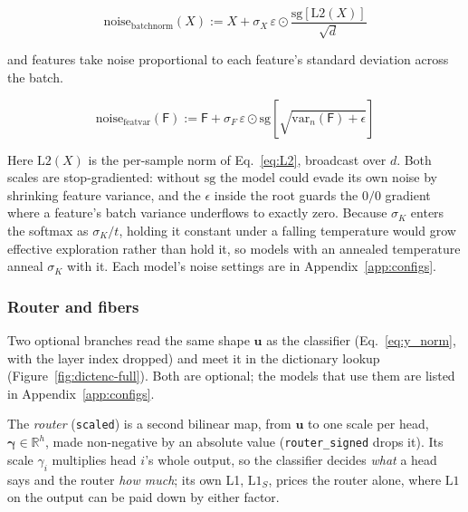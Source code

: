 \begin{equation}
	\mathrm{noise}_{\mathrm{batchnorm}}(X) := X + \sigma_X\,\varepsilon
	\odot \frac{\mathrm{sg}\!\left[\mathrm{L2}(X)\right]}{\sqrt{d}}
	\label{eq:noise_batchnorm}
\end{equation}

and features take noise proportional to each feature's standard
deviation across the batch.

\begin{equation}
	\mathrm{noise}_{\mathrm{featvar}}(\mathsf{F}) := \mathsf{F} +
	\sigma_F\,\varepsilon \odot \mathrm{sg}\!\left[
	\sqrt{\mathrm{var}_n(\mathsf{F}) + \epsilon}\right]
	\label{eq:noise_featvar}
\end{equation}

Here $\mathrm{L2}(X)$ is the per-sample norm of
Eq.~\eqref{eq:L2}, broadcast over $d$. Both scales are
stop-gradiented: without $\mathrm{sg}$ the model could evade its own
noise by shrinking feature variance, and the $\epsilon$ inside the root
guards the $0/0$ gradient where a feature's batch variance underflows to
exactly zero. Because $\sigma_K$ enters the softmax as $\sigma_K/t$,
holding it constant under a falling temperature would grow effective
exploration rather than hold it, so models with an annealed temperature
anneal $\sigma_K$ with it. Each model's noise settings are in
Appendix~\ref{app:configs}.

\subsubsection{Router and fibers}
\label{sec:router-fiber}
Two optional branches read the same shape $\mathbf{u}$ as the classifier
(Eq.~\eqref{eq:y_norm}, with the layer index dropped) and meet it in
the dictionary lookup
(Figure~\ref{fig:dictenc-full}). Both are optional; the models that use
them are listed in Appendix~\ref{app:configs}.

The \emph{router} (\texttt{scaled}) is a second bilinear map, from
$\mathbf{u}$ to one scale per head, $\boldsymbol{\gamma} \in \mathbb{R}^h$,
made non-negative by an absolute value
(\texttt{router\_signed} drops it). Its scale $\gamma_i$ multiplies head
$i$'s whole output, so
the classifier decides \emph{what} a head says and the router \emph{how
much}; its own L1, $\mathrm{L1}_S$, prices the router alone, where
$\mathrm{L1}$ on the output can be paid down by either factor.

